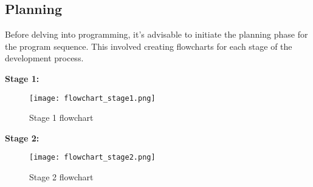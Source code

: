 \documentclass[../report.tex]{subfiles}
\begin{document}
    \subsection{Planning}
    Before delving into programming, it's advisable to initiate the planning
    phase for the program sequence. This involved creating flowcharts for each
    stage of the development process.

    
    \textbf{Stage 1:}
    \begin{figure}[H]
        \centering
        \texttt{[image: flowchart\_stage1.png]}
        \caption{Stage 1 flowchart}
    \end{figure}
    \textbf{Stage 2:}
    \begin{figure}[H]
        \centering
        \texttt{[image: flowchart\_stage2.png]}
        \caption{Stage 2 flowchart}
    \end{figure}
\end{document}
